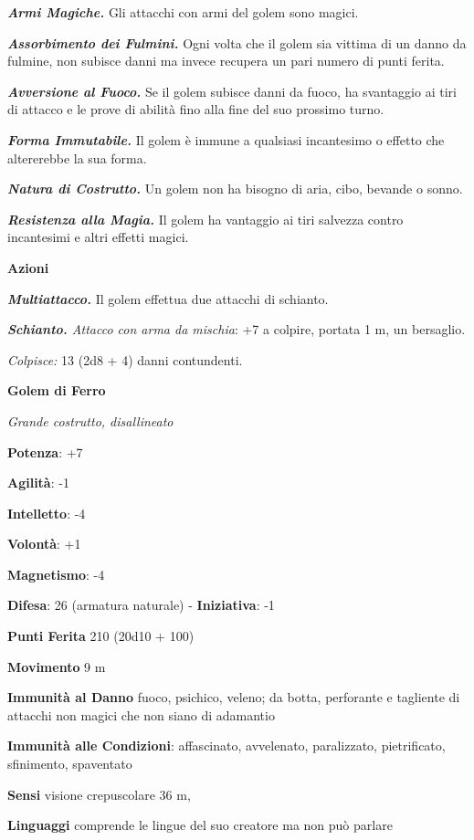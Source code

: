 \begin{multicols}{2}
\emph{\textbf{Armi Magiche.}} Gli attacchi con armi del golem sono
magici.

\emph{\textbf{Assorbimento dei Fulmini.}} Ogni volta che il golem sia
vittima di un danno da fulmine, non subisce danni ma invece recupera un
pari numero di punti ferita.

\emph{\textbf{Avversione al Fuoco.}} Se il golem subisce danni da fuoco,
ha svantaggio ai tiri di attacco e le prove di abilità fino alla fine
del suo prossimo turno.

\emph{\textbf{Forma Immutabile.}} Il golem è immune a qualsiasi
incantesimo o effetto che altererebbe la sua forma.

\emph{\textbf{Natura di Costrutto.}} Un golem non ha bisogno di aria,
cibo, bevande o sonno.

\emph{\textbf{Resistenza alla Magia.}} Il golem ha vantaggio ai tiri
salvezza contro incantesimi e altri effetti magici.

\smallskip\textbf{Azioni}

\emph{\textbf{Multiattacco.}} Il golem effettua due attacchi di
schianto.

\emph{\textbf{Schianto.} Attacco con arma da mischia}: +7 a colpire,
portata 1 m, un bersaglio.

\emph{Colpisce:} 13 (2d8 + 4) danni contundenti.



\textbf{Golem di Ferro}

\emph{Grande costrutto, disallineato}

\textbf{Potenza}: +7

\textbf{Agilità}: -1

\textbf{Intelletto}: -4

\textbf{Volontà}: +1

\textbf{Magnetismo}: -4

\textbf{Difesa}: 26 (armatura naturale) - \textbf{Iniziativa}: -1

\textbf{Punti Ferita} 210 (20d10 + 100)

\textbf{Movimento} 9 m

\textbf{Immunità al Danno} fuoco, psichico, veleno; da botta,
perforante e tagliente di attacchi non magici che non siano di adamantio

\textbf{Immunità alle Condizioni}: affascinato, avvelenato, paralizzato,
pietrificato, sfinimento, spaventato

\textbf{Sensi} visione crepuscolare 36 m, 

\textbf{Linguaggi} comprende le lingue del suo creatore ma non può
parlare


\end{multicols}
